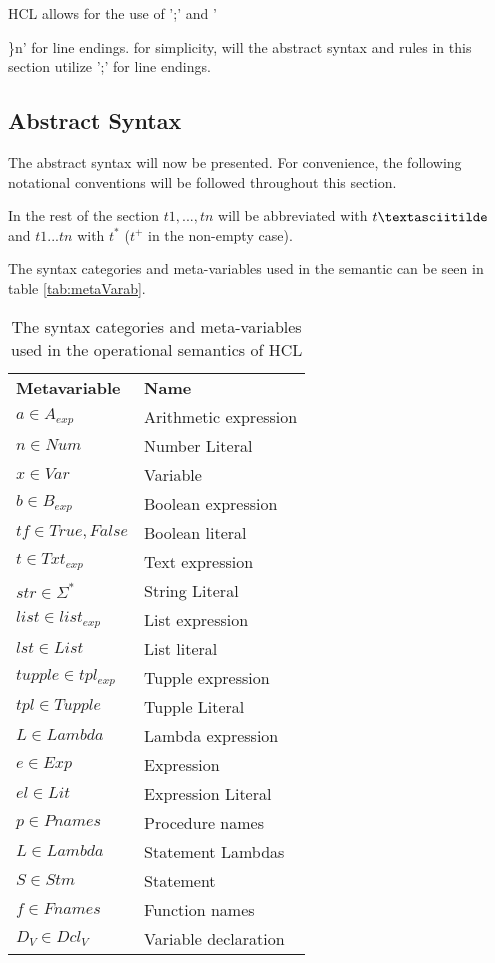 HCL allows for the use of ';' and '{\}n' for line endings.
for simplicity, will the abstract syntax and rules in this section utilize ';' for line endings. 

\subsection{Abstract Syntax}
The abstract syntax will now be presented.
For convenience, the following notational conventions will be followed throughout this section.

In the rest of the section $t1, .
.
.
 , tn$ will be abbreviated with $t\textasciitilde$ and $t1 .
 .
 .
  tn$ with $t^*$ ($t^+$ in the non-empty case).

The syntax categories and meta-variables used in the semantic can be seen in table \ref{tab:metaVarab}. 
\begin{center}
	\begin{table}[ht]
		\centering
		\caption{The syntax categories and meta-variables used in the operational semantics of HCL}
		\label{tab:metaVar}
		\begin{tabular}{ll}
			\textbf{Metavariable} & \textbf{Name} \\
			$a \in A_{exp}$ 	  & Arithmetic expression \\
			$n \in Num$			  & Number Literal \\
			$x \in Var$           & Variable \\
			$b \in B_{exp}$		  & Boolean expression\\ 
			$tf \in {True,False}$ & Boolean literal \\
			$t \in Txt_{exp}$     & Text expression\\
			$str \in {\Sigma^*}$  & String Literal \\
			$list \in list_{exp}$ & List expression \\
			$lst \in List$		  & List literal\\
			$tupple \in tpl_{exp}$& Tupple expression\\
			$tpl \in Tupple$	  & Tupple Literal\\
			$L \in Lambda$		  & Lambda expression\\
			$e \in Exp$			  & Expression\\
			$el \in Lit$		  & Expression Literal\\
			$p \in Pnames$        & Procedure names\\
			$L \in Lambda$        & Statement Lambdas\\
			$S \in Stm$           & Statement\\
			$f \in Fnames$ 		  & Function names\\
			$D_V \in Dcl_V$		  & Variable declaration \\
			

\end{tabular}
\end{table}
\end{center}}

